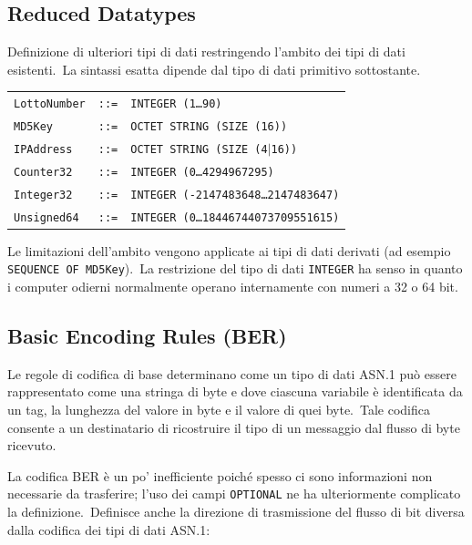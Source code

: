 \subsection{Reduced Datatypes}

Definizione di ulteriori tipi di dati restringendo l'ambito dei tipi di dati esistenti.\
La sintassi esatta dipende dal tipo di dati primitivo sottostante.
\begin{table}[H]
    \centering
    \begin{tabular}{l l l}
        \texttt{LottoNumber} & \texttt{::=} & \texttt{INTEGER (1\dots90)}                   \\
        \texttt{MD5Key}      & \texttt{::=} & \texttt{OCTET STRING (SIZE (16))}             \\
        \texttt{IPAddress}   & \texttt{::=} & \texttt{OCTET STRING (SIZE (4$|$16))}         \\
        \texttt{Counter32}   & \texttt{::=} & \texttt{INTEGER (0\dots4294967295)}           \\
        \texttt{Integer32}   & \texttt{::=} & \texttt{INTEGER (-2147483648\dots2147483647)} \\
        \texttt{Unsigned64}  & \texttt{::=} & \texttt{INTEGER (0\dots18446744073709551615)} \\
    \end{tabular}
\end{table}

\noindent Le limitazioni dell'ambito vengono applicate ai tipi di dati derivati (ad esempio \texttt{SEQUENCE OF MD5Key}).\
La restrizione del tipo di dati \texttt{INTEGER} ha senso in quanto i computer odierni normalmente operano internamente con numeri a 32 o 64 bit.

\subsection{Basic Encoding Rules (BER)}

Le regole di codifica di base determinano come un tipo di dati ASN.1 può essere rappresentato come una stringa di byte e dove ciascuna variabile è identificata da un tag, la lunghezza del valore in byte e il valore di quei byte.\
Tale codifica consente a un destinatario di ricostruire il tipo di un messaggio dal flusso di byte ricevuto.\

La codifica BER è un po' inefficiente poiché spesso ci sono informazioni non necessarie da trasferire; l'uso dei campi \texttt{OPTIONAL} ne ha ulteriormente complicato la definizione.\
Definisce anche la direzione di trasmissione del flusso di bit diversa dalla codifica dei tipi di dati ASN.1:

